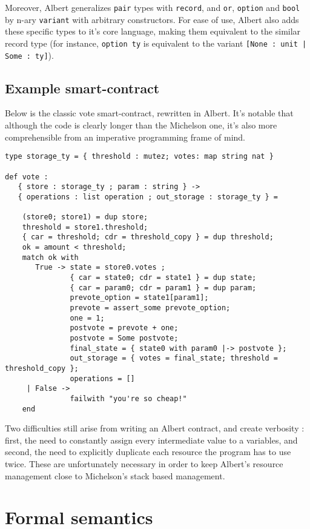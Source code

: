 \documentclass{report}
\begin{document}
Moreover, Albert generalizes \texttt{pair} types with \texttt{record}, and \texttt{or}, \texttt{option} and \texttt{bool} by n-ary \texttt{variant} with arbitrary constructors. For ease of use, Albert also adds these specific types to it's core language, making them equivalent to the similar record type (for instance, \texttt{option ty} is equivalent to the variant \texttt{[None : unit | Some : ty]}).

\subsection{Example smart-contract}

Below is the classic vote smart-contract, rewritten in Albert. It's notable that although the code is clearly longer than the Michelson one, it's also more comprehensible from an imperative programming frame of mind.

\lstset{language=albert}
\begin{lstlisting}
type storage_ty = { threshold : mutez; votes: map string nat }

def vote :
   { store : storage_ty ; param : string } ->
   { operations : list operation ; out_storage : storage_ty } =

    (store0; store1) = dup store;
    threshold = store1.threshold;
    { car = threshold; cdr = threshold_copy } = dup threshold;
    ok = amount < threshold;
    match ok with
       True -> state = store0.votes ;
               { car = state0; cdr = state1 } = dup state;
               { car = param0; cdr = param1 } = dup param;
               prevote_option = state1[param1];
               prevote = assert_some prevote_option;
               one = 1;
               postvote = prevote + one;
               postvote = Some postvote;
               final_state = { state0 with param0 |-> postvote };
               out_storage = { votes = final_state; threshold = threshold_copy };
               operations = []
     | False ->
               failwith "you're so cheap!"
    end
\end{lstlisting}

Two difficulties still arise from writing an Albert contract, and create verbosity : first, the need to constantly assign every intermediate value to a variables, and second, the need to explicitly duplicate each resource the program has to use twice. These are unfortunately necessary in order to keep Albert's resource management close to Michelson's stack based management.

\section{Formal semantics}
\end{document}
